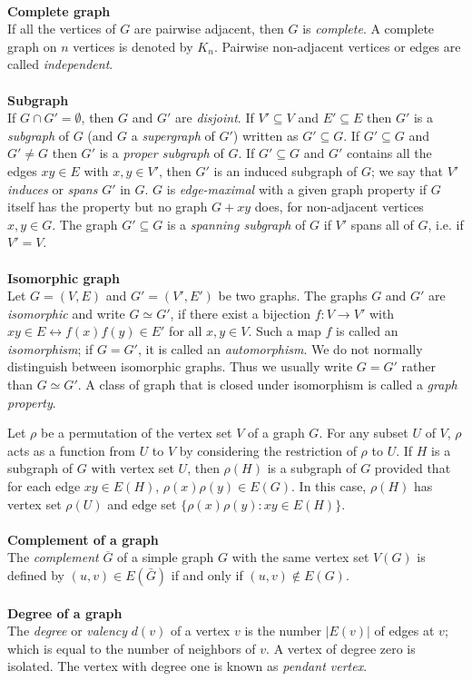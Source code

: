 \documentclass[12pt]{report}
\begin{document}
\\
{\bf Complete graph}\\ If all the vertices of $G$ are pairwise
adjacent, then $G$ is {\em complete}. A complete graph on $n$
vertices is denoted by $K_n$. Pairwise non-adjacent vertices or
edges are called {\em independent}.\\
\\
{\bf Subgraph}\\
If $G\cap G'=\emptyset$, then $G$ and $G'$ are {\em disjoint}. If
$V'\subseteq V$ and $E'\subseteq E$ then $G'$ is a {\em subgraph} of
$G$ (and $G$ a {\em supergraph} of $G'$) written as $G'\subseteq G$.
If $G'\subseteq G$ and $G'\neq G$ then $G'$ is a {\em proper
subgraph} of $G$. If $G'\subseteq G$ and $G'$ contains all the edges
$xy\in E$ with $x,y\in V'$, then $G'$ is an induced subgraph of $G$;
we say that $V'$ {\em induces} or {\em spans} $G'$ in $G$. $G$ is
{\em edge-maximal} with a given graph property if $G$ itself has the
property but no graph $G+xy$ does, for non-adjacent vertices $x,y\in
G$.
The graph $G'\subseteq G$  is a {\em spanning subgraph} of $G$ if $V'$ spans all of $G$, i.e. if $V'=V$.\\
\\
{\bf Isomorphic graph}\\
Let $G=(V,E)$ and $G'=(V',E')$ be two graphs. The graphs $G$ and
$G'$ are {\em isomorphic} and write $G\simeq G'$, if there exist a
bijection $f:V\longrightarrow V'$ with $xy \in E \leftrightarrow
f(x)f(y) \in E'$ for all $x,y\in V$. Such a map $f$ is called an
{\em isomorphism}; if $G=G'$, it is called an {\em automorphism}. We
do not normally distinguish between isomorphic graphs. Thus we
usually write $G=G'$ rather than $G\simeq G'$. A class of graph that
is closed under isomorphism is called a {\em graph property}.

Let $\rho$ be a permutation of the vertex set $V$ of a graph $G$. For any subset $U$ of $V$, $\rho$ acts as a function from $U$ to $V$ by considering the restriction of $\rho$ to $U$. If $H$ is a subgraph of $G$ with vertex set $U$, then $\rho (H)$ is a subgraph of $G$ provided that for each edge $xy\in E(H)$, $\rho (x) \rho (y)\in E(G)$. In this case, $\rho (H)$ has vertex set $\rho (U)$ and edge set $\{\rho (x) \rho (y) :xy\in E(H)\}$.\\
\\
{\bf   Complement of a graph}\\  The {\em complement} $\overline{G}$ of a simple graph $G$ with the same vertex set $V(G)$ is defined by $(u,v)\in E(\bar{G})$ if and only if $(u,v)\notin E(G)$.\\
\\
{\bf  Degree of a graph}\\
  The {\em degree} or {\em valency} $d(v)$ of a vertex $v$ is the number $|E(v)|$ of edges at $v$; which is equal to the number of neighbors of $v$. A vertex of degree zero is isolated.
The vertex with degree one is known as {\em pendant vertex}.
\end{document}
